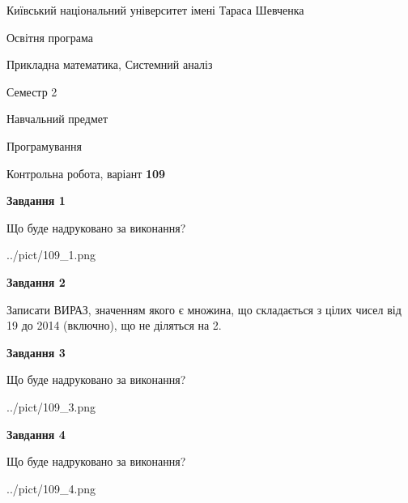 \documentclass[12pt, ukrainian]{article}
\begin{document}
{{\begin {small}\par
{ \center  Київський національний університет імені Тараса Шевченка \par}
{\parbox {5 cm}{Освітня програма \hfill}{\parbox {8 cm}{Прикладна математика, Системний аналіз \hfill}}\parbox {5 cm}{\hfill Семестр 2}}\par
{\parbox {5 cm} {Навчальний предмет \hfill}\parbox {7 cm}{Програмування \hfill}\parbox {6cm}{\hfill}\par}\vspace{-7pt} \end{small}}{\center Контрольна робота, варіант  \No \textbf
{ 109 }\par}}
{
\begin {large}
{\begin {center}\textbf{Завдання 1}\end {center}}\par
Що буде надруковано за виконання?\par\par
\begin{center}
	{../pict/109_1.png}
\end{center}
\newpage

{\begin {center}\textbf{Завдання 2}\end {center}}\par
Записати ВИРАЗ, значенням якого є множина, що складається з цілих чисел від 19 до 2014 (включно), що не діляться на 2.\par
\newpage

{\begin {center}\textbf{Завдання 3}\end {center}}\par
Що буде надруковано за виконання?\par
\begin{center}
	{../pict/109_3.png}
\end{center}
\newpage

{\begin {center}\textbf{Завдання 4}\end {center}}\par
Що буде надруковано за виконання?\par
\begin{center}
	{../pict/109_4.png}
\end{center}
\newpage


\end{large}}
\end{document}
